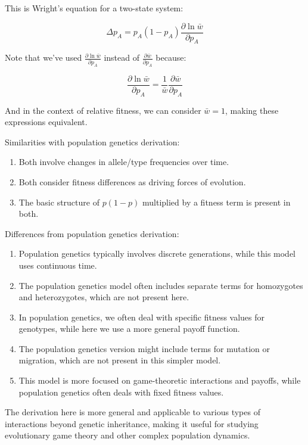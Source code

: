 \documentclass{article}
\begin{document}
This is Wright's equation for a two-state system:

\[ \Delta p_A = p_A(1-p_A)\frac{\partial \ln \bar{w}}{\partial p_A} \]

Note that we've used $\frac{\partial \ln \bar{w}}{\partial p_A}$ instead of $\frac{\partial \bar{w}}{\partial p_A}$ because:

\[ \frac{\partial \ln \bar{w}}{\partial p_A} = \frac{1}{\bar{w}}\frac{\partial \bar{w}}{\partial p_A} \]

And in the context of relative fitness, we can consider $\bar{w} = 1$, making these expressions equivalent.

Similarities with population genetics derivation:
\begin{enumerate}
    \item Both involve changes in allele/type frequencies over time.
    \item Both consider fitness differences as driving forces of evolution.
    \item The basic structure of $p(1-p)$ multiplied by a fitness term is present in both.
\end{enumerate}

Differences from population genetics derivation:
\begin{enumerate}
    \item Population genetics typically involves discrete generations, while this model uses continuous time.
    \item The population genetics model often includes separate terms for homozygotes and heterozygotes, which are not present here.
    \item In population genetics, we often deal with specific fitness values for genotypes, while here we use a more general payoff function.
    \item The population genetics version might include terms for mutation or migration, which are not present in this simpler model.
    \item This model is more focused on game-theoretic interactions and payoffs, while population genetics often deals with fixed fitness values.
\end{enumerate}

The derivation here is more general and applicable to various types of interactions beyond genetic inheritance, making it useful for studying evolutionary game theory and other complex population dynamics.
\end{document}
